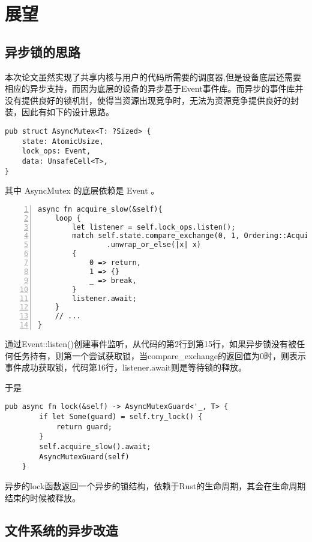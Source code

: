 \section{展望}
\subsection{异步锁的思路}

本次论文虽然实现了共享内核与用户的代码所需要的调度器,但是设备底层还需要相应的异步支持，而因为底层的设备的异步基于Event事件库。而异步的事件库并没有提供良好的锁机制，使得当资源出现竞争时，无法为资源竞争提供良好的封装，因此有如下的设计思路。

\begin{lstlisting}[caption=异步锁结构]
pub struct AsyncMutex<T: ?Sized> {
    state: AtomicUsize,
    lock_ops: Event,
    data: UnsafeCell<T>,
}
\end{lstlisting}

其中 AsyncMutex 的底层依赖是 Event 。

\begin{lstlisting}[caption=异步锁的工作机制, numbers=left, label=asyncmutex]
async fn acquire_slow(&self){
    loop {
        let listener = self.lock_ops.listen();
        match self.state.compare_exchange(0, 1, Ordering::Acquire, Ordering::Acquire)
                .unwrap_or_else(|x| x)
        {
            0 => return,
            1 => {}
            _ => break,
        }
        listener.await;
    }
    // ...
}
\end{lstlisting}

通过Event::listen()创建事件监听，从代码的第2行到第15行，如果异步锁没有被任何任务持有，则第一个尝试获取锁，当compare\_exchange的返回值为0时，则表示事件成功获取锁，代码第16行，listener.await则是等待锁的释放。 

于是  
\begin{lstlisting}[caption = 异步锁]
pub async fn lock(&self) -> AsyncMutexGuard<'_, T> {
        if let Some(guard) = self.try_lock() {
            return guard;
        }
        self.acquire_slow().await;
        AsyncMutexGuard(self)
    }
\end{lstlisting}

异步的lock函数返回一个异步的锁结构，依赖于Rust的生命周期，其会在生命周期结束的时候被释放。


\subsection{文件系统的异步改造}


